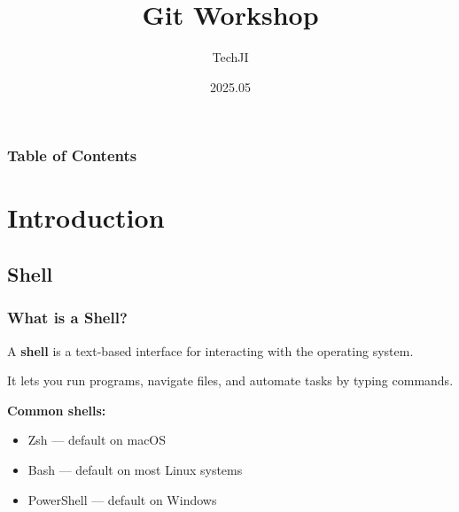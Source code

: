 \documentclass[aspectratio=169]{beamer}
\title[Course number]{Git Workshop}
\author[]{TechJI}
\institute[UMJI-SJTU]
{
	University of Michigan - Shanghai Jiaotong University
	\\\medskip
	Joint Institute
}
\date{2025.05}
\begin{document}
\maketitle
\begin{frame}
  \frametitle{Table of Contents}
  \tableofcontents
\end{frame}

\section{Introduction}
\subsection{Shell}
\begin{frame}
  \frametitle{What is a Shell?}

  A \textbf{shell} is a text-based interface for interacting with the operating system.

  \vspace{0.7em}
  It lets you run programs, navigate files, and automate tasks by typing commands.

  \vspace{1em}
  \textbf{Common shells:}
  \begin{itemize}
    \item Zsh — default on macOS
    \item Bash — default on most Linux systems
    \item PowerShell — default on Windows
  \end{itemize}
\end{frame}
\end{document}
